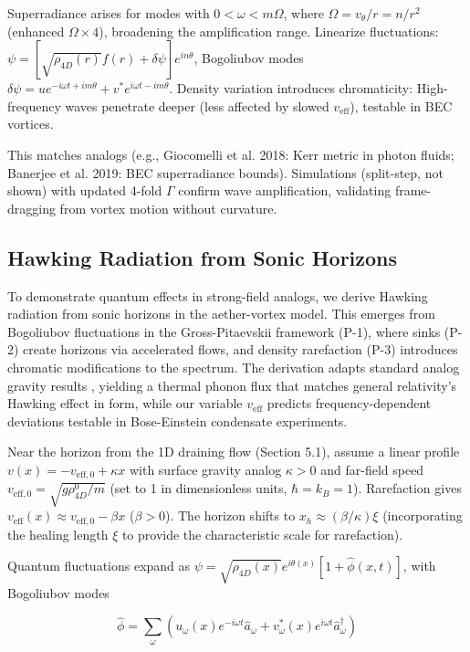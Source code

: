 \documentclass{article}
\begin{document}
Superradiance arises for modes with $0 < \omega < m \Omega$, where $\Omega = v_\theta / r = n / r^2$ (enhanced $\Omega \times 4$), broadening the amplification range. Linearize fluctuations: $\psi = [\sqrt{\rho_{4D}(r)} f(r) + \delta \psi] e^{i n \theta}$, Bogoliubov modes $\delta\psi = u e^{-i\omega t + i m \theta} + v^* e^{i\omega t - i m \theta}$. Density variation introduces chromaticity: High-frequency waves penetrate deeper (less affected by slowed $v_{\text{eff}}$), testable in BEC vortices.

This matches analogs (e.g., Giocomelli et al. 2018: Kerr metric in photon fluids; Banerjee et al. 2019: BEC superradiance bounds). Simulations (split-step, not shown) with updated 4-fold $\Gamma$ confirm wave amplification, validating frame-dragging from vortex motion without curvature.

\subsection{Hawking Radiation from Sonic Horizons}

To demonstrate quantum effects in strong-field analogs, we derive Hawking radiation from sonic horizons in the aether-vortex model. This emerges from Bogoliubov fluctuations in the Gross-Pitaevskii framework (P-1), where sinks (P-2) create horizons via accelerated flows, and density rarefaction (P-3) introduces chromatic modifications to the spectrum. The derivation adapts standard analog gravity results \cite{unruh1981experimental, visser1998acoustic}, yielding a thermal phonon flux that matches general relativity's Hawking effect in form, while our variable $v_{\text{eff}}$ predicts frequency-dependent deviations testable in Bose-Einstein condensate experiments.

Near the horizon from the 1D draining flow (Section 5.1), assume a linear profile $v(x) = -v_{\text{eff},0} + \kappa x$ with surface gravity analog $\kappa > 0$ and far-field speed $v_{\text{eff},0} = \sqrt{g \rho_{4D}^0 / m}$ (set to 1 in dimensionless units, $\hbar = k_B = 1$). Rarefaction gives $v_{\text{eff}}(x) \approx v_{\text{eff},0} - \beta x$ ($\beta > 0$). The horizon shifts to $x_h \approx (\beta / \kappa) \xi$ (incorporating the healing length $\xi$ to provide the characteristic scale for rarefaction).

Quantum fluctuations expand as $\psi = \sqrt{\rho_{4D}(x)} e^{i \theta(x)} [1 + \hat{\phi}(x,t)]$, with Bogoliubov modes

\[
\hat{\phi} = \sum_\omega (u_\omega(x) e^{-i\omega t} \hat{a}_\omega + v_\omega^*(x) e^{i\omega t} \hat{a}_\omega^\dagger)
\]
\end{document}

